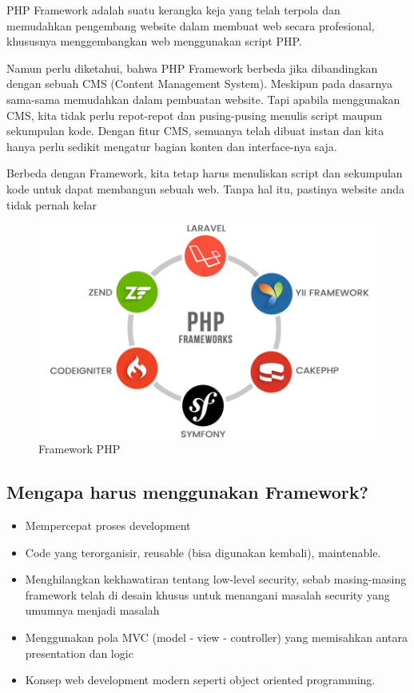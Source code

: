 \begin{enumerate}
PHP Framework adalah suatu kerangka keja yang telah terpola dan memudahkan pengembang website dalam membuat web secara profesional, khususnya menggembangkan web menggunakan script PHP.

Namun perlu diketahui, bahwa PHP Framework berbeda jika dibandingkan dengan sebuah CMS (Content Management System). Meskipun pada dasarnya sama-sama memudahkan dalam pembuatan website. Tapi apabila menggunakan CMS, kita tidak perlu repot-repot dan pusing-pusing menulis script maupun sekumpulan kode. Dengan fitur CMS, semuanya telah dibuat instan dan kita hanya perlu sedikit mengatur bagian konten dan interface-nya saja.

Berbeda dengan Framework, kita tetap harus menuliskan script dan sekumpulan kode untuk dapat membangun sebuah web. Tanpa hal itu, pastinya website anda tidak pernah kelar

	\begin{figure}[H]
		\includegraphics[width=12cm]{figures/web/phpframework.png}
		\centering
		\caption{Framework PHP}
	\end{figure}
\subsection{Mengapa harus menggunakan Framework?}
\begin{itemize}
	\item Mempercepat proses development
	\item Code yang terorganisir, reusable (bisa digunakan kembali), maintenable.
	\item Menghilangkan kekhawatiran tentang low-level security, sebab masing-masing framework telah di desain khusus untuk menangani masalah security yang umumnya menjadi masalah
	\item Menggunakan pola MVC (model - view - controller) yang memisahkan antara presentation dan logic
	\item Konsep web development modern seperti object oriented programming.


\end{itemize}
\end{enumerate}
